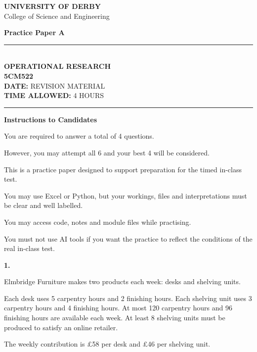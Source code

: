 \documentclass[11pt,a4paper]{article}
\newcommand{\universityname}{UNIVERSITY OF DERBY}
\newcommand{\college}{College of Science and Engineering}
\newcommand{\examtitle}{Practice Paper A}
\newcommand{\moduletitle}{OPERATIONAL RESEARCH}
\newcommand{\modulecode}{5CM522}
\newcommand{\examdate}{REVISION MATERIAL}
\newcommand{\timeallowed}{4 HOURS}
\begin{document}
\begin{center}
{\large \textbf{\universityname}}\\
{\college}
\end{center}

\vspace{0.5em}

\begin{center}
{\Large \textbf{\examtitle}}\\[0.5em]
\rule{\textwidth}{0.4pt}\\[0.6em]
{\large \textbf{\moduletitle}}\\
{\large \textbf{\modulecode}}\\[0.4em]
\textbf{DATE:} \examdate\\
\textbf{TIME ALLOWED:} \timeallowed\\[0.3em]
\rule{\textwidth}{0.4pt}
\end{center}

\textbf{Instructions to Candidates}

You are required to answer a total of 4 questions.

However, you may attempt all 6 and your best 4 will be considered.

This is a practice paper designed to support preparation for the timed in-class test.

You may use Excel or Python, but your workings, files and interpretations must be clear and well labelled.

You may access code, notes and module files while practising.

You must not use AI tools if you want the practice to reflect the conditions of the real in-class test.

\newpage

\textbf{1.}

Elmbridge Furniture makes two products each week: desks and shelving units.

Each desk uses 5 carpentry hours and 2 finishing hours.
Each shelving unit uses 3 carpentry hours and 4 finishing hours.
At most 120 carpentry hours and 96 finishing hours are available each week.
At least 8 shelving units must be produced to satisfy an online retailer.

The weekly contribution is \pounds58 per desk and \pounds46 per shelving unit.
\end{document}
